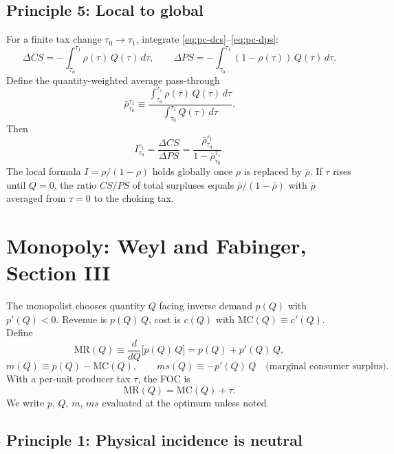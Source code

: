\documentclass[11pt]{article}
\begin{document}
\subsection{Principle 5: Local to global}

For a finite tax change $\tau_0 \to \tau_1$, integrate
\eqref{eq:pc-dcs}--\eqref{eq:pc-dps}:
\[
  \Delta CS = -\int_{\tau_0}^{\tau_1} \rho(\tau)\,Q(\tau)\,d\tau,
  \qquad
  \Delta PS = -\int_{\tau_0}^{\tau_1} (1-\rho(\tau))\,Q(\tau)\,d\tau.
\]
Define the quantity-weighted average pass-through
\[
  \bar\rho_{\tau_0}^{\tau_1}
  \equiv
  \frac{\int_{\tau_0}^{\tau_1} \rho(\tau)\,Q(\tau)\,d\tau}
       {\int_{\tau_0}^{\tau_1} Q(\tau)\,d\tau}.
\]
Then
\[
  I_{\tau_0}^{\tau_1}
  = \frac{\Delta CS}{\Delta PS}
  = \frac{\bar\rho_{\tau_0}^{\tau_1}}{1 - \bar\rho_{\tau_0}^{\tau_1}}.
\]
The local formula $I = \rho/(1-\rho)$ holds globally once $\rho$ is replaced
by $\bar\rho$.  If $\tau$ rises until $Q=0$, the ratio $CS/PS$ of total
surpluses equals $\bar\rho/(1-\bar\rho)$ with $\bar\rho$ averaged from
$\tau=0$ to the choking tax.

\section{Monopoly: Weyl and Fabinger, Section III}
\label{sec:monopoly}

The monopolist chooses quantity $Q$ facing inverse demand $p(Q)$ with
$p'(Q) < 0$.  Revenue is $p(Q)\,Q$, cost is $c(Q)$ with
$\mathrm{MC}(Q) \equiv c'(Q)$.  Define
\[
  \mathrm{MR}(Q) \equiv \frac{d}{dQ}\bigl[p(Q)\,Q\bigr] = p(Q) + p'(Q)\,Q,
\]
\[
  m(Q) \equiv p(Q) - \mathrm{MC}(Q),
  \qquad
  ms(Q) \equiv -p'(Q)\,Q \quad \text{(marginal consumer surplus)}.
\]
With a per-unit producer tax $\tau$, the FOC is
\begin{equation}
  \mathrm{MR}(Q) = \mathrm{MC}(Q) + \tau.
  \label{eq:mr-tax}
\end{equation}
We write $p$, $Q$, $m$, $ms$ evaluated at the optimum unless noted.

\subsection{Principle 1: Physical incidence is neutral}
\end{document}

